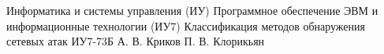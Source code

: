 \makeresearchworktitle
{Информатика и системы управления (ИУ)}
{Программное обеспечение ЭВМ и информационные технологии (ИУ7)}
{Классификация методов обнаружения сетевых атак}
{ИУ7-73Б}
{А. В. Криков}
{П. В. Клорикьян}
{}
{}